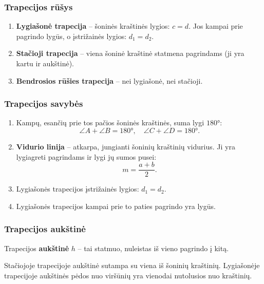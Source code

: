 \subsubsection*{Trapecijos rūšys}

\begin{enumerate}
    \item \textbf{Lygiašonė trapecija} – šoninės kraštinės lygios: $c = d$. Jos kampai prie pagrindo lygūs, o įstrižainės lygios: $d_1 = d_2$.
    \item \textbf{Stačioji trapecija} – viena šoninė kraštinė statmena pagrindams (ji yra kartu ir aukštinė).
    \item \textbf{Bendrosios rūšies trapecija} – nei lygiašonė, nei stačioji.
\end{enumerate}

\subsubsection*{Trapecijos savybės}

\begin{theorem}
\begin{enumerate}
    \item Kampų, esančių prie tos pačios šoninės kraštinės, suma lygi $180°$:
    \[
    \angle A + \angle B = 180°, \quad \angle C + \angle D = 180°.
    \]
    \item \textbf{Vidurio linija} – atkarpa, jungianti šoninių kraštinių vidurius. Ji yra lygiagreti pagrindams ir lygi jų sumos pusei:
    \[
    m = \frac{a + b}{2}.
    \]
    \item Lygiašonės trapecijos įstrižainės lygios: $d_1 = d_2$.
    \item Lygiašonės trapecijos kampai prie to paties pagrindo yra lygūs.
\end{enumerate}
\end{theorem}

\subsubsection*{Trapecijos aukštinė}

Trapecijos \textbf{aukštinė} $h$ – tai statmuo, nuleistas iš vieno pagrindo į kitą.

\begin{remark}
Stačiojoje trapecijoje aukštinė sutampa su viena iš šoninių kraštinių. Lygiašonėje trapecijoje aukštinės pėdos nuo viršūnių yra vienodai nutolusios nuo kraštinių.
\end{remark}

